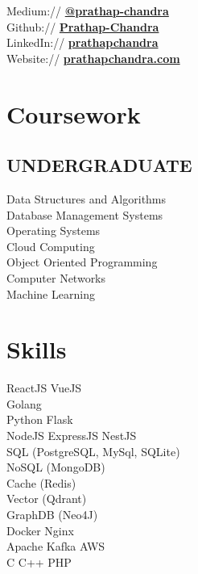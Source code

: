 \documentclass{deedy-resume-openfont}
\begin{document}
\begin{minipage}[t]{0.33\textwidth}
Medium:// \href{https://medium.com/@prathap-chandra/}{\bf @prathap-chandra} \\
Github:// \href{https://github.com/Prathap-Chandra}{\bf Prathap-Chandra} \\
LinkedIn://  \href{https://www.linkedin.com/in/prathapchandra}{\bf prathapchandra} \\
Website://  \href{https://www.prathapchandra.com/}{\bf prathapchandra.com} \\

\sectionsep
\section{Coursework}
\subsection{UNDERGRADUATE}
Data Structures and Algorithms\\
Database Management Systems\\
Operating Systems\\
Cloud Computing\\
Object Oriented Programming\\
Computer Networks\\
Machine Learning\\
\sectionsep


\section{Skills}
\textbullet{} ReactJS \textbullet{} VueJS \\
\textbullet{} Golang \\
\textbullet{} Python \textbullet{} Flask\\
\textbullet{} NodeJS \textbullet{} ExpressJS \textbullet{} NestJS\\ 
\textbullet{} SQL (PostgreSQL, MySql, SQLite) \\ 
\textbullet{} NoSQL (MongoDB) \\ 
\textbullet{} Cache (Redis)  \\ 
\textbullet{} Vector (Qdrant) \\
\textbullet{} GraphDB (Neo4J) \\ 
\textbullet{} Docker \textbullet{} Nginx \\
\textbullet{} Apache Kafka \textbullet{} AWS \\
\textbullet{} C \textbullet{} C++ \textbullet{} PHP\\

\sectionsep


\end{minipage} 
\end{document}
